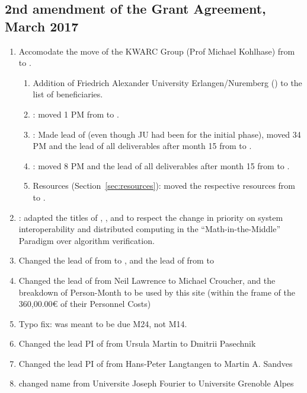 \subsection*{2nd amendment of the Grant Agreement, March 2017}
\begin{enumerate}
\item Accomodate the move of the KWARC Group (Prof Michael Kohlhase) from  to
  .
\begin{enumerate}
\item Addition of Friedrich Alexander University Erlangen/Nuremberg () to the
  list of beneficiaries.
\item {}: moved 1 PM from  to .
\item {}: Made  lead of  (even though JU had been
  for the initial phase), moved 34 PM and the lead of all deliverables after month 15 from
   to .
\item {}: moved 8 PM and the lead of all deliverables after month 15 from
   to .
\item Resources (Section~\ref{sec:resources}): moved the respective resources from
   to .
\end{enumerate}
\item {}: adapted the titles of ,
  , and  to respect the change in
  priority on system interoperability and distributed computing in the
  ``Math-in-the-Middle'' Paradigm over algorithm verification.
\item Changed the lead of 
  from  to , and the lead of  from  to 
\item Changed the lead of  from Neil Lawrence to Michael Croucher, and the breakdown
of Person-Month to be used by this site (within the frame of the 360,00.00€ of their Personnel Costs)
\item Typo fix:  was meant to be due M24, not M14.
\item Changed the lead PI of  from Ursula Martin to Dmitrii Pasechnik
\item Changed the lead PI of  from Hans-Peter Langtangen to Martin A. Sandves
\item {} changed name from Universite Joseph Fourier to Universite Grenoble Alpes

\end{enumerate}
